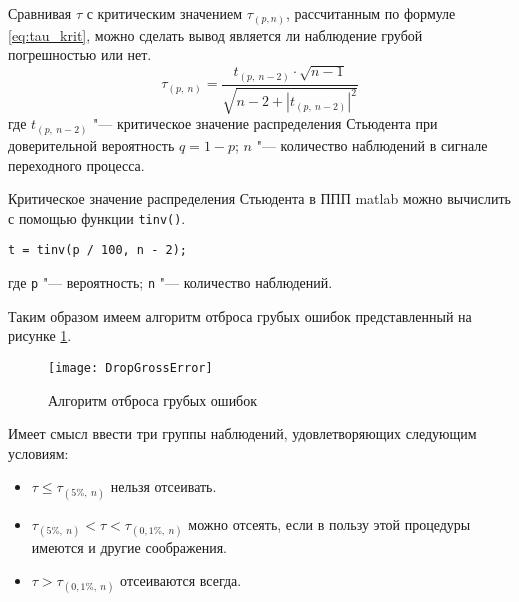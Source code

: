 Сравнивая $ \tau $ с критическим значением $ \tau_{(p,n)} $, рассчитанным по формуле \ref{eq:tau_krit}, можно сделать вывод является ли наблюдение грубой погрешностью или нет.
\begin{equation}\label{eq:tau_krit}
\tau_{(p,\ n)}=\frac{t_{(p,\ n-2)}\cdot\sqrt{n-1}}{\sqrt{n-2+|t_{(p,\ n-2)}|^2}}
\end{equation}
где $ t_{(p,\ n-2)} $ "--- критическое значение распределения Стьюдента при доверительной вероятность $ q=1-p $; $ n $ "--- количество наблюдений в сигнале переходного процесса.

Критическое значение распределения Стьюдента в ППП matlab можно вычислить с помощью функции \lstinline{tinv()}. 
\begin{lstlisting}[stepnumber=0]
t = tinv(p / 100, n - 2);
\end{lstlisting}
где \lstinline{p} "--- вероятность; \lstinline{n} "--- количество наблюдений.

Таким образом имеем алгоритм отброса грубых ошибок представленный на рисунке \ref{img:AlgDGE}.

\begin{figure}[!ht]
	\center
	\texttt{[image: DropGrossError]}
	\caption{Алгоритм отброса грубых ошибок} 
	\label{img:AlgDGE}  
\end{figure}

Имеет смысл ввести три группы наблюдений, удовлетворяющих следующим условиям:
\begin{itemize}
	\item $ \tau \leqslant \tau_{(5\%,\ n)} $ нельзя отсеивать.
	\item $ \tau_{(5\%,\ n)} < \tau < \tau_{(0,1\%,\ n)} $ можно отсеять, если в пользу этой процедуры имеются и другие соображения.
	\item $ \tau > \tau_{(0,1\%,\ n)} $ отсеиваются всегда.
\end{itemize}

